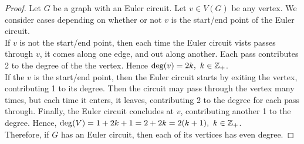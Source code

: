 \documentclass{report}
\begin{document}



\begin{proof}
	Let $G$ be a graph with an Euler circuit. Let $v\in V(G)$ be any vertex. We consider cases depending on whether or not $v$ is the start/end point of the Euler circuit. \\

	If $v$ is not the start/end point, then each time the Euler circuit vists passes through $v$, it comes along one edge, and out along another. Each pass contributes 2 to the degree of the the vertex. Hence $\deg(v)=2k,\ k\in\mathbb{Z}_+$. \\

	If the $v$ is the start/end point, then the Euler circuit starts by exiting the vertex, contributing 1 to its degree. Then the circuit may pass through the vertex many times, but each time it enters, it leaves, contributing 2 to the degree for each pass through. Finally, the Euler circuit concludes at $v$, contributing another 1 to the degree. Hence, $\deg(V)=1+2k+1=2+2k=2(k+1),\ k\in\bbz_+$. \\

	Therefore, if $G$ has an Euler circuit, then each of its vertices has even degree.
\end{proof}

\end{document}
